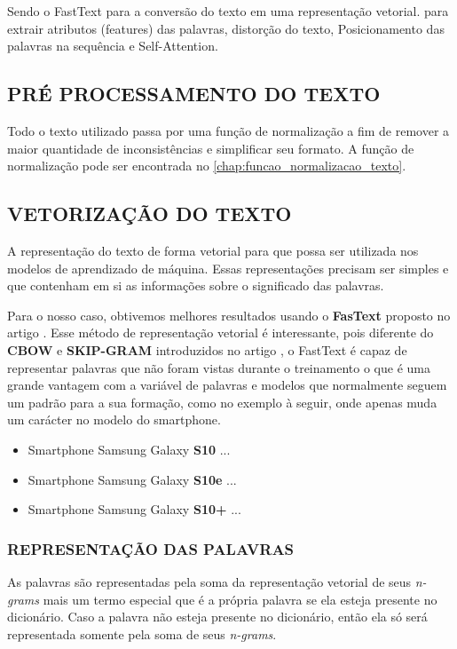 Sendo o FastText para a conversão do texto em uma representação vetorial.
para extrair atributos (features) das palavras, distorção do texto, Posicionamento das palavras na sequência e Self-Attention.

\subsection{PRÉ PROCESSAMENTO DO TEXTO}

Todo o texto utilizado passa por uma função de normalização a fim de remover a maior quantidade de inconsistências e simplificar seu formato. A função de normalização pode ser encontrada no \autoref{chap:funcao_normalizacao_texto}.

\subsection{VETORIZAÇÃO DO TEXTO}

A representação do texto de forma vetorial para que possa ser utilizada nos modelos de aprendizado de máquina. Essas representações precisam ser simples e que contenham em si as informações sobre o significado das palavras.

Para o nosso caso, obtivemos melhores resultados usando o \textbf{FasText} proposto no artigo \cite{fasttext}. Esse método de representação vetorial é interessante, pois diferente do \textbf{CBOW} e \textbf{SKIP-GRAM} introduzidos no artigo \cite{mikolov}, o FastText é capaz de representar palavras que não foram vistas durante o treinamento o que é uma grande vantagem com a variável de palavras e modelos que normalmente seguem um padrão para a sua formação, como no exemplo à seguir, onde apenas muda um carácter no modelo do smartphone.

\begin{itemize}
\item Smartphone Samsung Galaxy \textbf{S10} ...
\item Smartphone Samsung Galaxy \textbf{S10e} ...
\item Smartphone Samsung Galaxy \textbf{S10+} ...
\end{itemize}

\subsubsection{REPRESENTAÇÃO DAS PALAVRAS}

As palavras são representadas pela soma da representação vetorial de seus \textit{n-grams} mais um termo especial que é a própria palavra se ela esteja presente no dicionário. Caso a palavra não esteja presente no dicionário, então ela só será representada somente pela soma de seus \textit{n-grams}.


